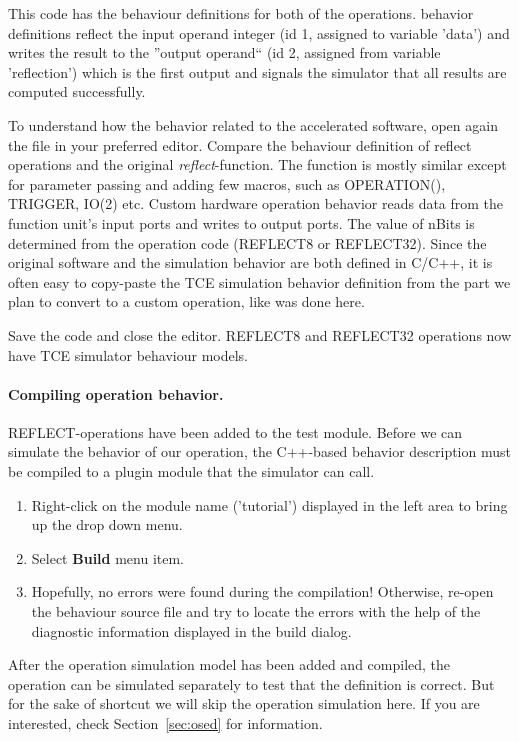 \documentclass[twoside]{tceusermanual}
\begin{document}
This code has the behaviour definitions for both of the operations. behavior
definitions reflect the input operand integer (id 1, assigned to
variable 'data') and writes the result to the ''output operand`` (id
2, assigned from variable 'reflection') which is the first output and
signals the simulator that all results are computed successfully.

To understand how the behavior related to the accelerated software,
open again the file  in your preferred editor. Compare the behaviour
definition of reflect operations and the original \textit{reflect}-function.
The function is mostly similar except for parameter passing and adding
few macros, such as OPERATION(), TRIGGER, IO(2) etc. Custom hardware
operation behavior reads data from the function unit's input ports and
writes to output ports. The value of nBits is determined from the
operation code (REFLECT8 or REFLECT32). Since the original software and
the simulation behavior are both defined in C/C++, it is often easy
to copy-paste the TCE simulation behavior definition from the part
we plan to convert to a custom operation, like was done here.

Save the code and close the editor. REFLECT8 and REFLECT32 operations
now have TCE simulator behaviour models.

\paragraph{Compiling operation behavior.} REFLECT-operations have been
added to the test module. Before we can simulate the behavior of our
operation, the C++-based behavior description must be compiled to a plugin
module that the simulator can call.

\begin{enumerate}
\item%
  Right-click on the module name ('tutorial') displayed in the left area to bring up the
  drop down menu.
\item%
  Select \textbf{Build} menu item. 
\item%
  Hopefully, no errors were found during the compilation! Otherwise, re-open
  the behaviour source file and try to locate the errors with the
  help of the diagnostic information displayed in the build dialog.
\end{enumerate}

After the operation simulation model has been added and compiled, the operation
can be simulated separately to test that the definition is correct. But for the
sake of shortcut we will skip the operation simulation here. If you are interested,
check Section~\ref{sec:osed} for information.
\end{document}
